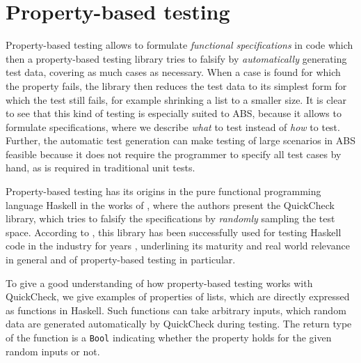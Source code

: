 \section{Property-based testing}
\label{sec:proptesting}
Property-based testing allows to formulate \textit{functional specifications} in code which then a property-based testing library tries to falsify by \textit{automatically} generating test data, covering as much cases as necessary. When a case is found for which the property fails, the library then reduces the test data to its simplest form for which the test still fails, for example shrinking a list to a smaller size. It is clear to see that this kind of testing is especially suited to ABS, because it allows to formulate specifications, where we describe \textit{what} to test instead of \textit{how} to test. %
Further, the automatic test generation can make testing of large scenarios in ABS feasible because it does not require the programmer to specify all test cases by hand, as is required in traditional unit tests.

Property-based testing has its origins in the pure functional programming language Haskell in the works of \cite{claessen_quickcheck_2000,claessen_testing_2002}, where the authors present the QuickCheck library, which tries to falsify the specifications by \textit{randomly} sampling the test space. According to \cite{hughes_quickcheck_2007}, this library has been successfully used for testing Haskell code in the industry for years , underlining its maturity and real world relevance in general and of property-based testing in particular.



To give a good understanding of how property-based testing works with \\ QuickCheck, we give examples of properties of lists, which are directly expressed as functions in Haskell. Such functions can take arbitrary inputs, which random data are generated automatically by QuickCheck during testing. The return type of the function is a \texttt{Bool} indicating whether the property holds for the given random inputs or not.

